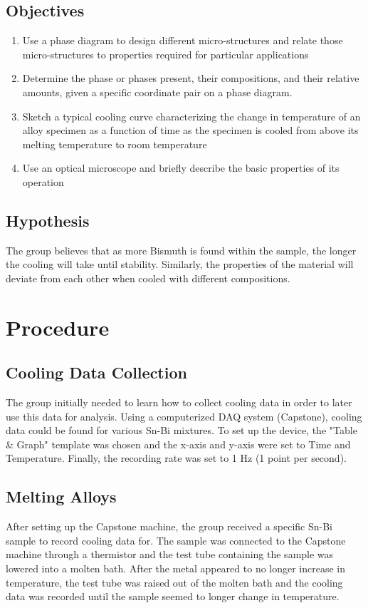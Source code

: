 \documentclass{article}
\begin{document}
\subsection{Objectives}
\begin{enumerate}
\item Use a phase diagram to design different micro-structures and relate those micro-structures to properties required for particular applications
\item Determine the phase or phases present, their compositions, and their relative amounts, given a specific coordinate pair on a phase diagram.
\item Sketch a typical cooling curve characterizing the change in temperature of an alloy specimen as a function of time as the specimen is cooled from above its melting temperature to room temperature
\item Use an optical microscope and briefly describe the basic properties of its operation
\end{enumerate}

\subsection{Hypothesis}
The group believes that as more Bismuth is found within the sample, the longer the cooling will take until stability. Similarly, the properties of the material will deviate from each other when cooled with different compositions. 

\section{Procedure}
\subsection{Cooling Data Collection}
The group initially needed to learn how to collect cooling data in order to later use this data for analysis. Using a computerized DAQ system (Capstone), cooling data could be found for various Sn-Bi mixtures. To set up the device, the "Table \& Graph" template was chosen and the x-axis and y-axis were set to Time and Temperature. Finally, the recording rate was set to 1 Hz (1 point per second).

\subsection{Melting Alloys}
After setting up the Capstone machine, the group received a specific Sn-Bi sample to record cooling data for. The sample was connected to the Capstone machine through a thermistor and the test tube containing the sample was lowered into a molten bath. After the metal appeared to no longer increase in temperature, the test tube was raised out of the molten bath and the cooling data was recorded until the sample seemed to longer change in temperature. 
\end{document}
